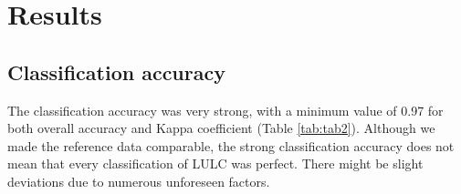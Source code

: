 \documentclass[utf8]{frontiersSCNS}
\begin{document}
\hypertarget{results}{%
\section*{Results}\label{results}}

\hypertarget{ref41}{%
\subsection{Classification accuracy}\label{ref41}}

The classification accuracy was very strong, with a minimum value of
0.97 for both overall accuracy and Kappa coefficient (Table
\ref{tab:tab2}). Although we made the reference data comparable, the
strong classification accuracy does not mean that every classification
of LULC was perfect. There might be slight deviations due to numerous
unforeseen factors.
\end{document}
